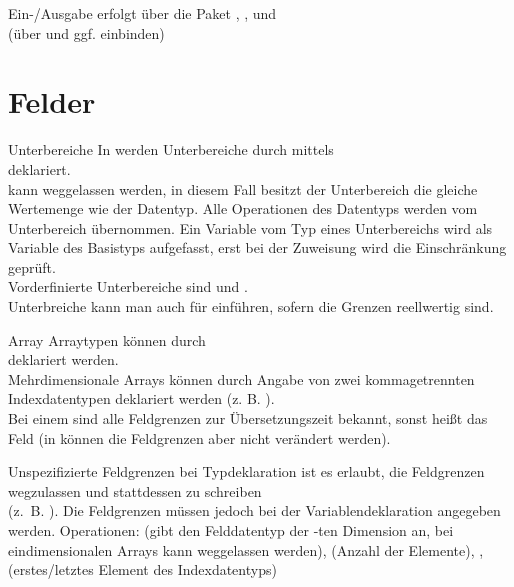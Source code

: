 \begin{Def}{Ein-/Ausgabe}
    erfolgt über die Paket ,
    , und \\
    (über  und ggf.  einbinden)
\end{Def}

\section{%
    Felder%
}

\begin{Def}{Unterbereiche}
    In \Ada{} werden Unterbereiche durch  mittels \\
    deklariert. \\
     kann weggelassen werden, in diesem Fall
    besitzt der Unterbereich die gleiche Wertemenge wie der Datentyp.
    Alle Operationen des Datentyps werden vom Unterbereich übernommen.
    Ein Variable vom Typ eines Unterbereichs wird als Variable des Basistyps
    aufgefasst, erst bei der Zuweisung wird die Einschränkung geprüft. \\
    Vorderfinierte Unterbereiche sind  und
    . \\
    Unterbreiche kann man auch für  einführen, sofern die
    Grenzen reellwertig sind.
\end{Def}

\begin{Def}{Array}
    Arraytypen können durch \\
    deklariert werden. \\
    Mehrdimensionale Arrays können durch Angabe von zwei kommagetrennten
    Indexdatentypen deklariert werden (z. B.
    ). \\
    Bei einem  sind alle Feldgrenzen zur
    Übersetzungszeit bekannt, sonst heißt das Feld 
    (in \Ada{} können die Feldgrenzen aber nicht verändert werden).
\end{Def}

\begin{Def}{Unspezifizierte Feldgrenzen}
    bei Typdeklaration ist es erlaubt, die Feldgrenzen wegzulassen und
    stattdessen  zu schreiben \\
    (z.~B. ).
    Die Feldgrenzen müssen jedoch bei der Variablendeklaration angegeben
    werden.
    Operationen:  (gibt den Felddatentyp der
    -ten Dimension an, bei eindimensionalen Arrays kann
     weggelassen werden),  (Anzahl der
    Elemente), ,  (erstes/letztes
    Element des Indexdatentyps)
\end{Def}

